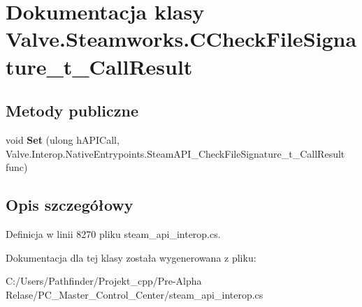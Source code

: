 \hypertarget{class_valve_1_1_steamworks_1_1_c_check_file_signature__t___call_result}{}\section{Dokumentacja klasy Valve.\+Steamworks.\+C\+Check\+File\+Signature\+\_\+t\+\_\+\+Call\+Result}
\label{class_valve_1_1_steamworks_1_1_c_check_file_signature__t___call_result}
\subsection*{Metody publiczne}
\begin{DoxyCompactItemize}
\item 
\mbox{\label{class_valve_1_1_steamworks_1_1_c_check_file_signature__t___call_result_a5b0fa4d86a06b5ef467e9a1de75cefc4}} 
void {\bfseries Set} (ulong h\+A\+P\+I\+Call, Valve.\+Interop.\+Native\+Entrypoints.\+Steam\+A\+P\+I\+\_\+\+Check\+File\+Signature\+\_\+t\+\_\+\+Call\+Result func)
\end{DoxyCompactItemize}


\subsection{Opis szczegółowy}


Definicja w linii 8270 pliku steam\+\_\+api\+\_\+interop.\+cs.



Dokumentacja dla tej klasy została wygenerowana z pliku\+:\begin{DoxyCompactItemize}
\item 
C\+:/\+Users/\+Pathfinder/\+Projekt\+\_\+cpp/\+Pre-\/\+Alpha Relase/\+P\+C\+\_\+\+Master\+\_\+\+Control\+\_\+\+Center/steam\+\_\+api\+\_\+interop.\+cs\end{DoxyCompactItemize}
